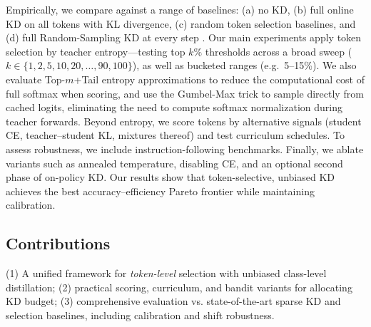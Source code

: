 \documentclass[11pt]{article}
\begin{document}
Empirically, we compare against a range of baselines: (a) no KD, (b) full online KD on all tokens with KL divergence, (c) random token selection baselines, and (d) full Random-Sampling KD at every step \citep{anshumann2025sparse}.
Our main experiments apply token selection by teacher entropy---testing top $k\%$ thresholds across a broad sweep ($k \in \{1,2,5,10,20,\ldots,90,100\}$), as well as bucketed ranges (e.g.\ 5--15\%).
We also evaluate Top-$m$+Tail entropy approximations to reduce the computational cost of full softmax when scoring, and use the Gumbel-Max trick to sample directly from cached logits, eliminating the need to compute softmax normalization during teacher forwards.
Beyond entropy, we score tokens by alternative signals (student CE, teacher--student KL, mixtures thereof) and test curriculum schedules.
To assess robustness, we include instruction-following benchmarks.
Finally, we ablate variants such as annealed temperature, disabling CE, and an optional second phase of on-policy KD.
Our results show that token-selective, unbiased KD achieves the best accuracy--efficiency Pareto frontier while maintaining calibration.

\subsection{Contributions} (1) A unified framework for \emph{token-level} selection with unbiased class-level distillation; (2) practical scoring, curriculum, and bandit variants for allocating KD budget; (3) comprehensive evaluation vs. state-of-the-art sparse KD and selection baselines, including calibration and shift robustness.
\end{document}

